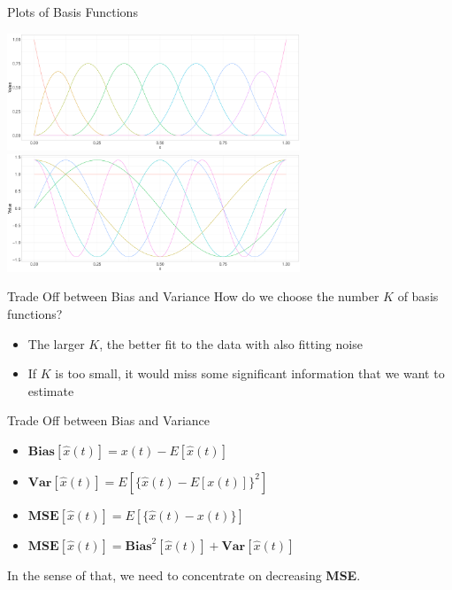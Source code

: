 \documentclass{beamer}
\begin{document}
	\begin{frame}{Plots of Basis Functions }
		\begin{minipage}[t]{\textwidth}
			\includegraphics[height = 3.5cm]{../Graphics/Bspline_Basis.pdf}
			\includegraphics[height = 3.5cm]{../Graphics/Fourier_Basis.pdf}
		\end{minipage}
	\end{frame}
	
	\begin{frame}{Trade Off between Bias and Variance}
		How do we choose the number $K$ of basis functions?
		\begin{itemize}
			\item The larger $K$, the better fit to the data with also fitting noise
			\item If $K$ is too small, it would miss some significant information that we want to estimate 
		\end{itemize}
	\end{frame}
	
	\begin{frame}{Trade Off between Bias and Variance}
		\begin{itemize}
			\item $\textbf{Bias}[\hat{x}(t)] = x(t) - E[\hat{x}(t)]$
			\item $\textbf{Var}[\hat{x}(t)] = E[\{\hat{x}(t) - E[x(t)]\}^2]$
			\item $\textbf{MSE}[\hat{x}(t)] = E[\{\hat{x}(t) - x(t)\}]$
			\item $\textbf{MSE}[\hat{x}(t)] = \textbf{Bias}^2[\hat{x}(t)] + \textbf{Var}[\hat{x}(t)]$
		\end{itemize}
		In the sense of that, we need to concentrate on decreasing \textbf{MSE}.
	\end{frame}
	
\end{document}
